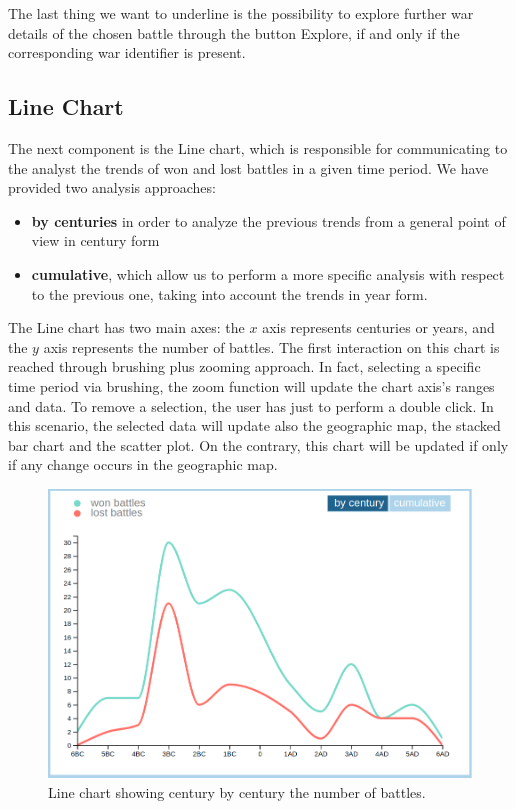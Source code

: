 The last thing we want to underline is the possibility to explore further war details of the chosen battle through the button Explore, if and only if the corresponding war identifier is present.

\subsection{Line Chart}
The next component is the Line chart, which is responsible for communicating to the analyst the trends of won and lost battles in a given time period.
We have provided two analysis approaches:
\begin{itemize}
    \item \textbf{by centuries} in order to analyze the previous trends from a general point of view in century form
    \item \textbf{cumulative}, which allow us to perform a more specific analysis with respect to the previous one, taking into account the trends in year form.
\end{itemize}

The Line chart has two main axes: the $x$ axis represents centuries or years, and the $y$ axis represents the number of battles.
The first interaction on this chart is reached through brushing plus zooming approach.
In fact, selecting a specific time period via brushing, the zoom function will update the chart axis's ranges and data.
To remove a selection, the user has just to perform a double click. In this scenario, the selected data will update also the geographic map, the stacked bar chart and the scatter plot.
On the contrary, this chart will be updated if only if any change occurs in the geographic map.

\begin{figure}[h]
    \centering
    \includegraphics[scale=0.20]{./images/line_chart.png}
    \caption{Line chart showing century by century the number of battles.}
\end{figure}

